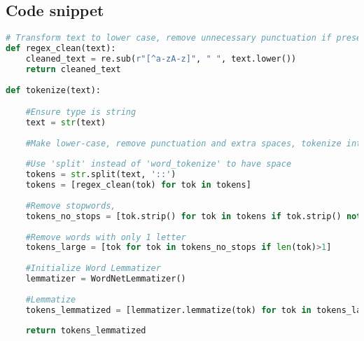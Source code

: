 \documentclass{article}
\begin{document}
	\subsection*{Code snippet}
\small
\begin{lstlisting}[language=Python]
# Transform text to lower case, remove unnecessary punctuation if present
def regex_clean(text):
	cleaned_text = re.sub(r"[^a-zA-z]", " ", text.lower())
	return cleaned_text
	
def tokenize(text):

	#Ensure type is string
	text = str(text)
	
	#Make lower-case, remove punctuation and extra spaces, tokenize into words/phrases.
	
	#Use 'split' instead of 'word_tokenize' to have space
	tokens = str.split(text, '::')
	tokens = [regex_clean(tok) for tok in tokens]
	
	#Remove stopwords, 
	tokens_no_stops = [tok.strip() for tok in tokens if tok.strip() not in all_stopwords]
	
	#Remove words with only 1 letter
	tokens_large = [tok for tok in tokens_no_stops if len(tok)>1]
	
	#Initialize Word Lemmatizer
	lemmatizer = WordNetLemmatizer()
	
	#Lemmatize
	tokens_lemmatized = [lemmatizer.lemmatize(tok) for tok in tokens_large]
	
	return tokens_lemmatized
\end{lstlisting}

%		
%		
%	
\end{document}
